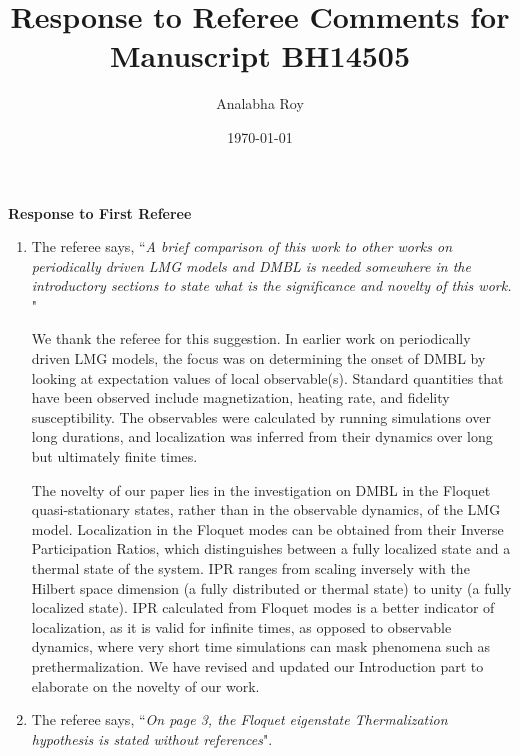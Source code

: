\documentclass[aps,prb,reprint,showpacs,floatfix,superscriptaddress, onecolumn, nofootinbib, 9pt]{revtex4-2}
\newcommand{\response}[1]{{\color{black}#1}} %
\newcommand{\comment}[1]{{\color{blue}#1}} %
\begin{document}
	
	\title{Response to Referee Comments for Manuscript BH14505}
	\author{Analabha Roy}
	\date{\today}
	
	\maketitle
	
	\vspace{1em}
	
	\noindent \textbf{Response to First Referee}
	
	\begin{enumerate}
		\item The referee says, \comment{``\textit{A brief comparison of this work to other works on periodically driven LMG models and DMBL is needed somewhere in the introductory sections to state what is the significance and novelty of this work. }"}\\
		
		\response{
			We thank the referee for this suggestion. In earlier work on periodically driven LMG models,
			the focus was on determining the onset of DMBL by looking at expectation values of local
			observable(s). Standard quantities that have been observed include magnetization, heating rate, and fidelity susceptibility. The observables were calculated by running simulations over long durations, and localization was inferred from their dynamics over long but ultimately finite times.
			
			The novelty of our paper lies in the investigation on DMBL in the Floquet quasi-stationary states, rather than in the observable dynamics, of the LMG model. Localization in the Floquet modes can be obtained from their Inverse Participation Ratios, which distinguishes between a fully localized state and a thermal state of the system. IPR ranges from scaling inversely with the Hilbert space dimension (a fully distributed or thermal state) to unity (a fully localized state). IPR calculated from Floquet modes is a better indicator of localization, as it is valid for infinite times, as opposed to observable dynamics, where very short time simulations can mask phenomena such as prethermalization. We have revised and updated our Introduction part to elaborate on the novelty of our work.
		}
		
		\item The referee says, \comment{``\textit{On page 3, the Floquet eigenstate Thermalization hypothesis is stated without references}".}\\
		

\end{enumerate}
\end{document}
